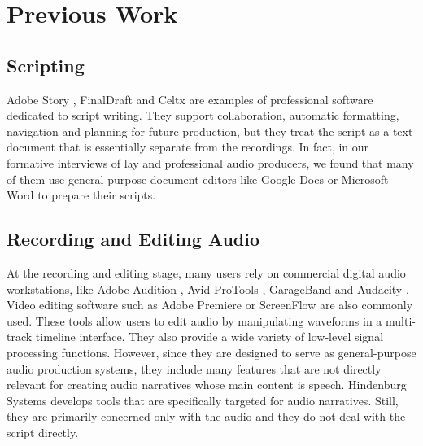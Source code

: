 \section{Previous Work}
\subsection{Scripting}
Adobe Story \cite{adobestory2016}, FinalDraft \cite{finaldraft2016} and Celtx \cite{celtx2016} are examples of professional software dedicated to script writing. They support collaboration, automatic formatting, navigation and planning for future production, but they treat the script as a text document that is essentially separate from the recordings. In fact, in our formative interviews of lay and professional audio producers, we found that many of them use general-purpose document editors like Google Docs \cite{googledocs2016} or Microsoft Word \cite{microsoftword2016} to prepare their scripts.

\subsection{Recording and Editing Audio}
At the recording and editing stage, many users rely on commercial digital audio workstations, like Adobe Audition \cite{adobeaudition2016}, Avid ProTools \cite{avidprotools}, GarageBand \cite{garageband} and Audacity \cite{audacity}. Video editing software such as Adobe Premiere \cite{premier} or ScreenFlow \cite{screenflow} are also commonly used. These tools allow users to edit audio by manipulating waveforms in a multi-track timeline interface. They also provide a wide variety of low-level signal processing functions. However, since they are designed to serve as general-purpose audio production systems, they include many features that are not directly relevant for creating audio narratives whose main content is speech. Hindenburg Systems \cite{hindenburg} develops tools that are specifically targeted for audio narratives. Still, they are primarily concerned only with the audio and they do not deal with the script directly.   

